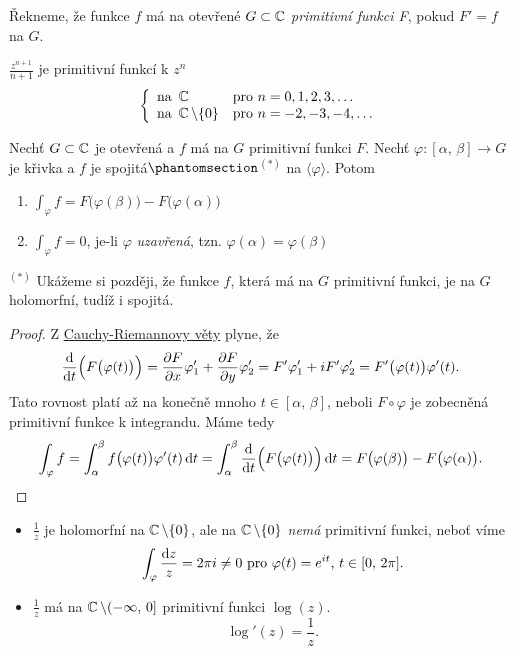 \begin{definition}
Řekneme, že funkce $f$ má na otevřené $G\subset\operatorname{\mathbb{C}}  $ \emph{primitivní funkci F}, pokud $F'=f$ na $G$.
\end{definition}

\begin{example}
$\frac{z^{n+1}}{n+1}$ je primitivní funkcí k $z^n$
$$\left\{ \begin{array}{ll} \text{na } \operatorname{\mathbb{C}}   & \mbox{pro } n=0,1,2,3, \dots \\ \text{na } \operatorname{\mathbb{C}}  \setminus\{0\} & \mbox{pro } n=-2,-3,-4, \dots \end{array} \right.$$
\end{example}

\begin{theorem}
Nechť $G\subset\operatorname{\mathbb{C}}  $ je otevřená a $f$ má na $G$ primitivní funkci $F$. Nechť $\varphi:[\alpha,\,\beta]\rightarrow G$ je křivka a $f$ je spojitá$\phantomsection$\hyperref[$^{(*)}$end]{$^{(*)}$} \label{^{(*)}start}na $\langle\varphi\rangle$. Potom
\begin{enumerate}
    \item $\int_\varphi f=F\bigl(\varphi(\beta)\bigr)-F\bigl(\varphi(\alpha)\bigr)$
    \item $\int_\varphi f=0$, je-li $\varphi$ \emph{uzavřená}, tzn. $\varphi(\alpha)=\varphi(\beta)$
\end{enumerate}
\end{theorem}
\begin{note}
\hyperref[^{(*)}start]{$^{(*)}$} \label{$^{(*)}$end} Ukážeme si později, že funkce $f$, která má na $G$ primitivní funkci, je na $G$ holomorfní, tudíž i spojitá.
\end{note}

\begin{proof}
Z \hyperref[CR]{Cauchy-Riemannovy věty} plyne, že 
$$\frac{\mathop{}\!\mathrm{d}}{\mathop{}\!\mathrm{d} t}\Bigl(F\bigl(\varphi(t)\bigr)\Bigr)=\frac{\partial F}{\partial x}\varphi'_1+\frac{\partial F}{\partial y}\varphi'_2=F'\varphi'_1+iF'\varphi'_2=F'\bigl(\varphi(t)\bigr)\varphi'(t)\text{.}$$
Tato rovnost platí až na konečně mnoho $t\in[\alpha,\, \beta]$, neboli $F\circ\varphi$ je zobecněná primitivní funkce k integrandu.
Máme tedy
$$\int_\varphi f=\int_\alpha^\beta f\bigl(\varphi(t)\bigr)\varphi'(t)\mathop{}\!\mathrm{d} t
=\int_\alpha^\beta \frac{\mathop{}\!\mathrm{d}}{\mathop{}\!\mathrm{d} t}\Bigl(F\bigl(\varphi(t)\bigr)\Bigr)\mathop{}\!\mathrm{d} t=
F\bigl(\varphi(\beta)\bigr)-F\bigl(\varphi(\alpha)\bigr)\text{.}$$
\end{proof}

\begin{example}
\mbox{}
\begin{itemize}
    \item $\frac{1}{z}$ je holomorfní na $\operatorname{\mathbb{C}}\setminus\{0\}$, ale na $\operatorname{\mathbb{C}}\setminus\{0\}$ \emph{nemá} primitivní funkci, neboť víme $$\int_\varphi \frac{\mathop{}\!\mathrm{d} z}{z}=2\pi i \neq 0 \text{ pro } \varphi(t)=e^{it}\text{, } t \in [0,\,2\pi]\text{.}$$ 
    \item $\frac{1}{z}$ má na $\operatorname{\mathbb{C}}  \setminus(-\infty,\,0]$ primitivní funkci $\log(z)$. $$\log'(z)=\frac{1}{z}\text{.}$$
\end{itemize}
\end{example}

